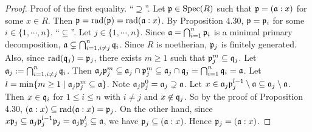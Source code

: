 \begin{proof}
    Proof of the first equality. ``$\supseteq$''. Let $\mathfrak{p} \in \operatorname{Spec}(R)$ such that $\mathfrak{p} = (\mathfrak{a}:x)$ for some $x \in R$. Then $\mathfrak{p} = \operatorname{rad}(\mathfrak{p}) = \operatorname{rad}(\mathfrak{a}:x)$. By Proposition 4.30, $\mathfrak{p} = \mathfrak{p}_i$ for some $i \in \{1,\cdots,n\}$. ``$\subseteq$''. Let $j \in \{1,\cdots,n\}$. Since $\mathfrak{a} = \bigcap_{i=1}^{n}\mathfrak{p}_i$ is a minimal primary decomposition, $\mathfrak{a} \subsetneq \bigcap_{i=1, i \neq j}^{n} \mathfrak{q}_i$. Since $R$ is noetherian, $\mathfrak{p}_j$ is finitely generated. Also, since $\operatorname{rad}(\mathfrak{q}_j) = \mathfrak{p}_j$, there exists $m \geq 1$ such that $\mathfrak{p}_j^{m} \subseteq \mathfrak{q}_j$. Let $\mathfrak{a}_j := \bigcap_{i=1,i \neq j}^{n} \mathfrak{q}_i$. Then $\mathfrak{a}_j \mathfrak{p}_j^{m} \subseteq \mathfrak{a}_j \cap \mathfrak{p}_j^{m} \subseteq \mathfrak{a}_j \cap \mathfrak{q}_j = \bigcap_{i=1}^{n} \mathfrak{q}_i = \mathfrak{a}$. Let $l = \min\{m \geq 1 \mid \mathfrak{a}_j \mathfrak{p}_j^{m} \subseteq \mathfrak{a}\}$. Note $\mathfrak{a}_j \mathfrak{p}_j^{0} = \mathfrak{a}_j \supsetneq \mathfrak{a}$. Let $x \in \mathfrak{a}_j \mathfrak{p}_j^{l-1} \setminus \mathfrak{a} \subseteq \mathfrak{a}_j \setminus \mathfrak{a}$. Then $x \in \mathfrak{q}_i$ for $1 \leq i \leq n$ with $i \neq j$ and $x \not \in \mathfrak{q}_j$. So by the proof of Proposition 4.30, $(\mathfrak{a}:x) \subseteq \operatorname{rad}(\mathfrak{a}:x) = \mathfrak{p}_j$. On the other hand, since $x\mathfrak{p}_j \subseteq \mathfrak{a}_j\mathfrak{p}_j^{l-1}\mathfrak{p}_j = \mathfrak{a}_j \mathfrak{p}_j^{l} \subseteq \mathfrak{a}$, we have $\mathfrak{p}_j \subseteq (\mathfrak{a}:x)$. Hence $\mathfrak{p}_j = (\mathfrak{a}:x)$.
\end{proof}

